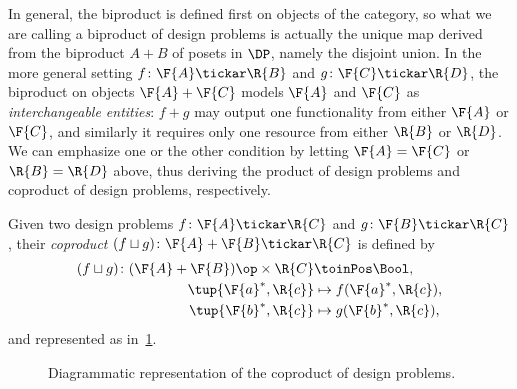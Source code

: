 In general, the biproduct is defined first on objects of the category, so what we are calling a biproduct of design
problems is actually the unique map derived from the biproduct $A + B$ of posets in $\DP$, namely the disjoint union. In the more general setting $f\colon \F{A} \tickar \R{B}$ and $g \colon \F{C} \tickar \R{D}$, the biproduct on objects $\F{A} + \F{C}$ models $\F{A}$ and $\F{C}$ as \emph{interchangeable entities}: $f+g$ may output one functionality from either $\F{A}$ or $\F{C}$, and similarly it requires only one resource from either $\R{B}$ or $\R{D}$. We can emphasize one or the other condition by letting $\F{A} = \F{C}$ or $\R{B} =\R{D}$ above, thus deriving the product of design problems and coproduct of design problems, respectively.


\begin{definition}
\label{define:coproduct}
Given two design problems $f\colon \F{A} \tickar \R{C}$ and $g \colon \F{B} \tickar \R{C}$, their \emph{coproduct} $(f \sqcup g)\colon \F{A} + \F{B} \tickar \R{C}$ is defined by
\begin{equation}
\begin{aligned}
    (f \sqcup g) \colon (\F{A} + \F{B})\op \times \R{C} & \toinPos \Bool,  \\
            \tup{ \F{a}^*, \R{c}} & \mapsto f(\F{a}^*, \R{c}), \\
            \tup{ \F{b}^*, \R{c}} & \mapsto g(\F{b}^*, \R{c}),
\end{aligned}
\end{equation}
and represented as in~\cref{fig:coproductdp}.

\begin{figure}[h!]
\begin{center}
\end{center}
\caption{Diagrammatic representation of the coproduct of design problems. \label{fig:coproductdp}}
\end{figure}
\end{definition}

